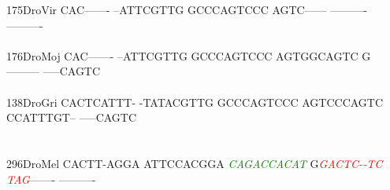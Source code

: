 \documentclass[11pt,twoside,reqno,a4paper]{article}
\begin{document}
{175\hspace*{1\charwidth}DroVir	CAC-------	--ATTCGTTG	GCCCAGTCCC	AGTC------	----------	----------	\\
\hspace*{4\charwidth}\hspace*{7\charwidth}\hspace*{1\charwidth}\hspace*{1\charwidth}\hspace*{1\charwidth}\hspace*{1\charwidth}\hspace*{1\charwidth}\hspace*{1\charwidth}\\
176\hspace*{1\charwidth}DroMoj	CAC-------	--ATTCGTTG	GCCCAGTCCC	AGTGGCAGTC	G---------	-----CAGTC	\\
\hspace*{4\charwidth}\hspace*{7\charwidth}\hspace*{1\charwidth}\hspace*{1\charwidth}\hspace*{1\charwidth}\hspace*{1\charwidth}\hspace*{1\charwidth}\hspace*{1\charwidth}\\
138\hspace*{1\charwidth}DroGri	CACTCATTT-	-TATACGTTG	GCCCAGTCCC	AGTCCCAGTC	CCATTTGT--	-----CAGTC	\\
\hspace*{4\charwidth}\hspace*{7\charwidth}\hspace*{1\charwidth}\hspace*{1\charwidth}\hspace*{1\charwidth}\hspace*{1\charwidth}\hspace*{1\charwidth}\hspace*{1\charwidth}\\
\\
296\hspace*{1\charwidth}DroMel	CACTT-AGGA	ATTCCACGGA	\textit{\textcolor{green}{C}}\textit{\textcolor{green}{A}}\textit{\textcolor{green}{G}}\textit{\textcolor{green}{A}}\textit{\textcolor{green}{C}}\textit{\textcolor{green}{C}}\textit{\textcolor{green}{A}}\textit{\textcolor{green}{C}}\textit{\textcolor{green}{A}}\textit{\textcolor{green}{T}}	G\textit{\textcolor{red}{G}}\textit{\textcolor{red}{A}}\textit{\textcolor{red}{C}}\textit{\textcolor{red}{T}}\textit{\textcolor{red}{C}}\textit{\textcolor{red}{-}}\textit{\textcolor{red}{-}}\textit{\textcolor{red}{T}}\textit{\textcolor{red}{C}}	\textit{\textcolor{red}{T}}\textit{\textcolor{red}{A}}\textit{\textcolor{red}{G}}-------	----------	\\
}
\end{document}
